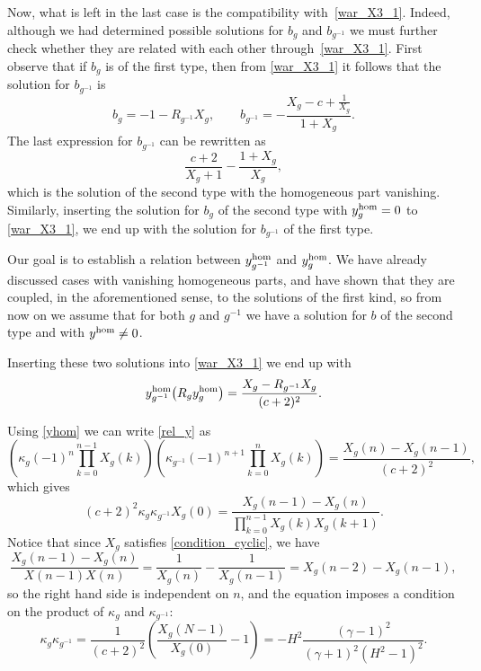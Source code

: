 \documentclass[pdftex]{sigma}
\numberwithin{equation}{section}
\begin{document}
Now, what is left in the last case is the compatibility with~\eqref{war_X3_1}. Indeed, although we had determined possible solutions for $b_g$ and
$b_{g^{-1}}$ we must further check whether they are related with each other through~\eqref{war_X3_1}. First observe that if $b_g$ is of the first type,
then from \eqref{war_X3_1} it follows that the solution for $b_{g^{-1}}$ is
\[ b_g=-1-R_{g^{-1}}X_g, \qquad b_{g^{-1}}=-\frac{X_g - c+\frac{1}{X_g}}{1+X_g}. \]
The last expression for $b_{g^{-1}}$ can be rewritten as
\[ \frac{c+2}{X_g+1}-\frac{1+X_g}{X_g}, \]
which is the solution of the second type with the homogeneous part vanishing. Similarly, inserting the solution for $b_g$ of the second type
with $y^{{\rm hom}}_g=0$ to \eqref{war_X3_1}, we end up with the solution for $b_{g^{-1}}$ of the first type.

Our goal is to establish a relation between $y^{{\rm hom}}_{g^{-1}}$ and $y^{{\rm hom}}_g$. We have already discussed cases with vanishing homogeneous parts,
and have shown that they are coupled, in the aforementioned sense, to the solutions of the first kind, so from now on we assume that for both $g$ and $g^{-1}$ we have
a solution for $b$ of the second type and with $y^{{\rm hom}}\neq 0$.

Inserting these two solutions into \eqref{war_X3_1} we end up with
\begin{equation}
y^{{\rm hom}}_{g^{-1}}\big(R_gy^{{\rm hom}}_g\big)=\frac{X_g-R_{g^{-1}}X_g}{(c+2)^2}. \label{rel_y}
\end{equation}

Using \eqref{yhom} we can write \eqref{rel_y} as
\begin{equation*}
\left(\kappa_g (-1)^n \prod_{k=0}^{n-1} X_g(k) \right)
\left( \kappa_{g^{-1}} (-1)^{n+1} \prod_{k=0}^{n} X_g(k) \right)
= \frac{X_g(n)-X_g(n-1)}{(c+2)^2},
\end{equation*}
which gives
\begin{equation*}
(c+2)^2\kappa_g\kappa_{g^{-1}}X_g(0)=\frac{X_g(n-1)-X_g(n)}{\prod\limits_{k=0}^{n-1}X_g(k)X_g(k+1)}.
\end{equation*}
Notice that since $X_g$ satisfies \eqref{condition_cyclic},
we have
\[
\frac{X_g(n-1)-X_g(n)}{X(n-1)X(n)} = \frac{1}{X_g(n)} - \frac{1}{X_g(n-1)}
= X_g(n-2) - X_g(n-1), \]
so the right hand side is independent on $n$, and the equation imposes a
condition on the product of $\kappa_g$ and $\kappa_{g^{-1}}$:
\begin{equation*}
\kappa_g\kappa_{g^{-1}}=\frac{1}{(c+2)^2}\left(\frac{X_g(N-1)}{X_g(0)}-1\right)
=- H^2 \frac{(\gamma-1)^2}{(\gamma+1)^2(H^2-1)^2}.
\end{equation*}
\end{document}
